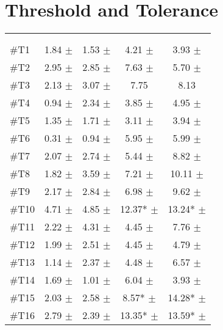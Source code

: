 \section{Threshold and Tolerance} \label{sec:ThresTolA}
\begin{longtable} {l|c|c|c|c}
 \rowcolor[HTML]{C0C0C0} 
  \color[HTML]{000000}{} & 
 \multicolumn{2}{c|}{ \color[HTML]{000000}{\textbf{Threshold}}} & \multicolumn{2}{c}{ \color[HTML]{000000}{\textbf{Tolerance}}}  	\\  \rule{0pt}{3ex} 
  \cellcolor[HTML]{C0C0C0}{} &
 \multicolumn{1}{c|}{ \cellcolor[HTML]{C0C0C0}{Pre [KgF]}} & \multicolumn{1}{c|}{ \cellcolor[HTML]{C0C0C0}{Post [KgF]}} 
 & \multicolumn{1}{|c|}{ \cellcolor[HTML]{C0C0C0}{Pre [KgF]}} 
 & \multicolumn{1}{c|}{ \cellcolor[HTML]{C0C0C0}{Post [KgF]}} 	\\ \hline 
\#T1 & 1.84 $\pm$ & 1.53 $\pm$ & 4.21 $\pm$ & 3.93 $\pm$ \\ \hline
\#T2 & 2.95 $\pm$ & 2.85 $\pm$ & 7.63 $\pm$ & 5.70 $\pm$ \\ \hline
\#T3 & 2.13 $\pm$ & 3.07 $\pm$ & 7.75 & 8.13 \\ \hline
\#T4 & 0.94 $\pm$ & 2.34 $\pm$ & 3.85 $\pm$ & 4.95 $\pm$  \\ \hline
\#T5 & 1.35 $\pm$  & 1.71 $\pm$  & 3.11 $\pm$  & 3.94 $\pm$  \\ \hline	
\#T6 & 0.31 $\pm$  & 0.94 $\pm$  & 5.95 $\pm$ & 5.99 $\pm$  \\ \hline
\#T7 & 2.07 $\pm$  & 2.74 $\pm$  & 5.44 $\pm$  & 8.82 $\pm$   \\ \hline
\#T8 & 1.82 $\pm$  & 3.59 $\pm$  & 7.21 $\pm$ & 10.11 $\pm$  \\ \hline
\#T9 & 2.17 $\pm$  & 2.84 $\pm$  & 6.98 $\pm$  & 9.62 $\pm$  \\ \hline
\#T10 & 4.71 $\pm$  & 4.85 $\pm$  & 12.37*  $\pm$  & 13.24* $\pm$  \\ \hline
\#T11 & 2.22 $\pm$  & 4.31 $\pm$ & 4.45 $\pm$  & 7.76 $\pm$  \\ \hline
\#T12 & 1.99 $\pm$  & 2.51 $\pm$  & 4.45 $\pm$  & 4.79 $\pm$   \\ \hline
\#T13 & 1.14 $\pm$  & 2.37 $\pm$  & 4.48 $\pm$  & 6.57 $\pm$  \\ \hline
\#T14 & 1.69 $\pm$  & 1.01 $\pm$ & 6.04 $\pm$  & 3.93 $\pm$  \\ \hline
\#T15 & 2.03 $\pm$  & 2.58 $\pm$   & 8.57* $\pm$  & 14.28* $\pm$  \\ \hline
\#T16 & 2.79 $\pm$  & 2.39 $\pm$  & 13.35* $\pm$  & 13.59* $\pm$  \\ \hline

\end{longtable}

